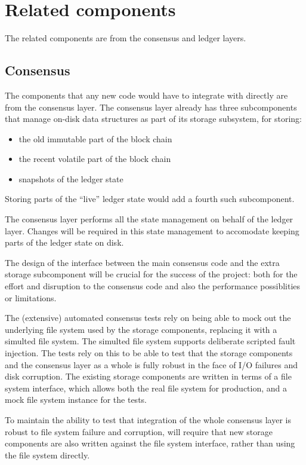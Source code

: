 \documentclass[11pt,a4paper]{article}
\begin{document}
\section{Related components}
\label{components}

The related components are from the consensus and ledger layers.

\subsection{Consensus}

The components that any new code would have to integrate with directly are from
the consensus layer. The consensus layer already has three subcomponents that
manage on-disk data structures as part of its storage subsystem, for storing:
\begin{itemize}
\item the old immutable part of the block chain
\item the recent volatile part of the block chain
\item snapshots of the ledger state
\end{itemize}
Storing parts of the ``live'' ledger state would add a fourth such subcomponent.

The consensus layer performs all the state management on behalf of the ledger
layer. Changes will be required in this state management to accomodate keeping
parts of the ledger state on disk.

The design of the interface between the main consensus code and the extra
storage subcomponent will be crucial for the success of the project: both for
the effort and disruption to the consensus code and also the performance
possiblities or limitations.

The (extensive) automated consensus tests rely on being able to mock out the
underlying file system used by the storage components, replacing it with a
simulted file system. The simulted file system supports deliberate scripted
fault injection. The tests rely on this to be able to test that the storage
components and the consensus layer as a whole is fully robust in the face of
I/O failures and disk corruption. The existing storage components are written
in terms of a file system interface, which allows both the real file system for
production, and a mock file system instance for the tests.

To maintain the ability to test that integration of the whole consensus layer
is robust to file system failure and corruption, will require that new storage
components are also written against the file system interface, rather than using
the file system directly.
\end{document}
